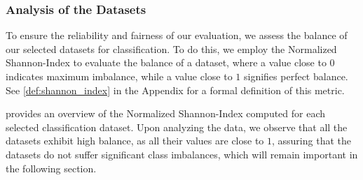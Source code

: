 \subsubsection{Analysis of the Datasets}
To ensure the reliability and fairness of our evaluation, we assess the balance of our selected datasets for classification. To do this, we employ the \textsf{Normalized Shannon-Index} to evaluate the balance of a dataset, where a value close to $0$ indicates maximum imbalance, while a value close to $1$ signifies perfect balance. See \cref{def:shannon_index} in the Appendix for a formal definition of this metric.

\begin{table}[H]
	\caption{An overview of the \textsf{Normalized Shannon-Index} calculated for each dataset.}
	\label{tab:shannon_index}
	\centering
\end{table}

 provides an overview of the \textsf{Normalized Shannon-Index} computed for each selected classification dataset. Upon analyzing the data, we observe that all the datasets exhibit high balance, as all their values are close to $1$, assuring that the datasets do not suffer significant class imbalances, which will remain important in the following section.

